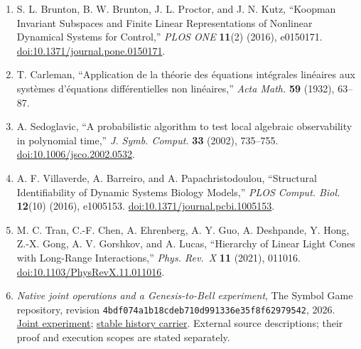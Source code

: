 \documentclass[
  11pt,
]{article}
\begin{document}
\begin{enumerate}
\item
  S. L. Brunton, B. W. Brunton, J. L. Proctor, and J. N. Kutz, ``Koopman Invariant Subspaces and Finite Linear Representations of Nonlinear Dynamical Systems for Control,'' \emph{PLOS ONE} \textbf{11}(2) (2016), e0150171. \href{https://doi.org/10.1371/journal.pone.0150171}{doi:10.1371/journal.pone.0150171}.
\item
  T. Carleman, ``Application de la théorie des équations intégrales linéaires aux systèmes d'équations différentielles non linéaires,'' \emph{Acta Math.} \textbf{59} (1932), 63--87.
\item
  A. Sedoglavic, ``A probabilistic algorithm to test local algebraic observability in polynomial time,'' \emph{J. Symb. Comput.} \textbf{33} (2002), 735--755. \href{https://doi.org/10.1006/jsco.2002.0532}{doi:10.1006/jsco.2002.0532}.
\item
  A. F. Villaverde, A. Barreiro, and A. Papachristodoulou, ``Structural Identifiability of Dynamic Systems Biology Models,'' \emph{PLOS Comput. Biol.} \textbf{12}(10) (2016), e1005153. \href{https://doi.org/10.1371/journal.pcbi.1005153}{doi:10.1371/journal.pcbi.1005153}.
\item
  M. C. Tran, C.-F. Chen, A. Ehrenberg, A. Y. Guo, A. Deshpande, Y. Hong, Z.-X. Gong, A. V. Gorshkov, and A. Lucas, ``Hierarchy of Linear Light Cones with Long-Range Interactions,'' \emph{Phys. Rev.~X} \textbf{11} (2021), 011016. \href{https://doi.org/10.1103/PhysRevX.11.011016}{doi:10.1103/PhysRevX.11.011016}.
\item
  \emph{Native joint operations and a Genesis-to-Bell experiment}, The Symbol Game repository, revision \texttt{4bdf074a1b18cdeb710d991336e35f8f62979542}, 2026. \href{https://github.com/dbccpage/the_symbol_game/blob/4bdf074a1b18cdeb710d991336e35f8f62979542/omega_engine/documentation/rust_crates/omega_wdp/docs/genesis_bell_experiment.md}{Joint experiment}; \href{https://github.com/dbccpage/the_symbol_game/blob/4bdf074a1b18cdeb710d991336e35f8f62979542/omega_engine/documentation/rust_crates/omega_wdp/docs/stable_genesis_carrier.md}{stable history carrier}. External source descriptions; their proof and execution scopes are stated separately.
\end{enumerate}
\end{document}
